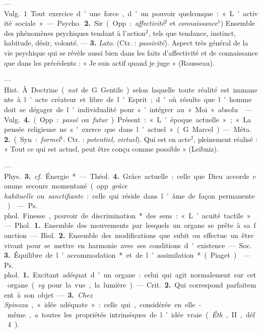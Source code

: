 \begin{itemize}[leftmargin=1cm, label=, itemsep=1pt]
 — \si{Vulg.} 1 Tout exercice
d’une force, d’un pouvoir quelconque : « L'activité sociale ».

— \si{Psycho.} {\bf 2.} Sir. (Opp. : {\it affectivité}$^2$ et {\it connaissance}$^1$) Ensemble
des phénomènes psychiques tendant
à l’action$^2$, tels que tendance, instinct, habitude, désir, volonté. —
 {\bf 3.} {\it Lato}. (Ctr. : {\it passivité}). Aspect
très général de la vie psychique qui
se révèle aussi bien dans les faits
d’affectivité et de connaissance que
dans les précédents : « Je suis actif
quand je juge » (Rousseau).

 — \si{Hist.} À Doctrine ({\it not}.
de G. Gentile) selon laquelle toute
réalité est immanente à l'acte créateur et libre de l'Esprit; d’où résulte
que l'homme doit se dégager de
l'individualité pour s'intégrer au
« Moi » absolu.

 — \si{Vulg.} {\bf 4.} (Opp. : {\it passé} ou
{\it futur}). Présent : « L'époque actuelle » ;
« La pensée religieuse ne s'exerce que
dans l’actuel » (G. Marcel).

— \si{Méta.} {\bf 2.} (Syn. : {\it formel}$^1$. Ctr. :
{\it potentiel, virtuel}). Qui est en acte$^2$,
pleinement réalisé : « Tout ce qui est
actuel, peut être conçu comme possible » (Leibniz).

— \si{Phys.} {\bf 3.} {\it cf.}  Énergie*.

— \si{Théol.} {\bf 4.} Grâce actuelle : celle
que Dieu accorde comme secours
momentané (opp. {\it grâce habituelle} ou
{\it sanctifiante} : celle qui réside dans
l’âme de façon permanente).

 — \si{Ps. phol.} Finesse,
pouvoir de discrimination* des sens :
« L'acuité tactile ».

 — \si{Phol.} {\bf 1.} Ensemble des
mouvements par lesquels un organe
se prête à sa fonction.

— \si{Biol.} {\bf 2.} Ensemble des modifications que subit ou effectue un être
vivant pour se mettre en harmonie
avec ses conditions d'existence.

— \si{Soc.} {\bf 3.} Équilibre de l’accommodation* et de l’assimilation* (Piaget).

 — \si{Ps. phol.} {\bf 1.} Excitant adéquat d'un organe : celui qui agit
normalement sur cet organe ({\it vg}.
pour la vue, la lumière).

— \si{Crit.} {\bf 2.} Qui correspond parfaitement à son objet. — {\bf 3.} {\it Chez
Spinoza}, « idée adéquate » : celle qui,
considérée en elle-même, a toutes
les propriétés intrinsèques de l’idée
vraie ({\it Éth}., II, déf. 4).


\end{itemize}
